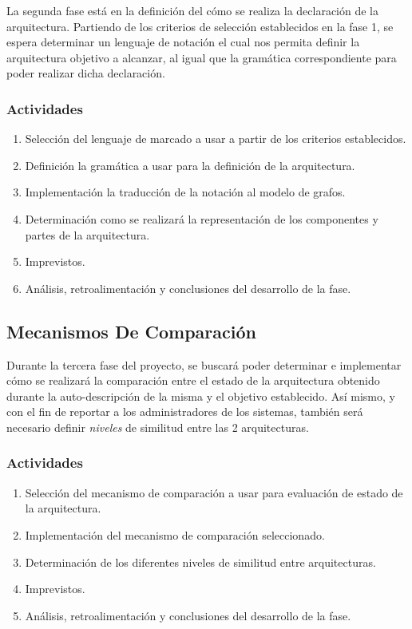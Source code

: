 \documentclass[12pt]{article}
\begin{document}
    La segunda fase está en la definición del cómo se realiza la declaración de la arquitectura. Partiendo de los criterios de selección establecidos en la fase 1, se espera determinar un lenguaje de notación el cual nos permita definir la arquitectura objetivo a alcanzar, al igual que la gramática correspondiente para poder realizar dicha declaración. 
    
    \subsubsection*{Actividades}

    \begin{enumerate}[label=\thesubsection.\arabic*., wide, labelindent=2em, leftmargin=5em]
        \item Selección del lenguaje de marcado a usar a partir de los criterios establecidos.
        \item Definición la gramática a usar para la definición de la arquitectura.
        \item Implementación la traducción de la notación al modelo de grafos. %
        \item Determinación como se realizará la representación de los componentes y partes de la arquitectura.
        \item Imprevistos.
        \item Análisis, retroalimentación y conclusiones del desarrollo de la fase. 
    \end{enumerate}    

    \subsection{Mecanismos De Comparación}

    Durante la tercera fase del proyecto, se buscará poder determinar e implementar cómo se realizará la comparación entre el estado de la arquitectura obtenido durante la auto-descripción de la misma y el objetivo establecido. Así mismo, y con el fin de reportar a los administradores de los sistemas, también será necesario definir \textit{niveles} de similitud entre las 2 arquitecturas.

    \subsubsection*{Actividades}

    \begin{enumerate}[label=\thesubsection.\arabic*., wide, labelindent=2em, leftmargin=5em]
        \item Selección del mecanismo de comparación a usar para evaluación de estado de la arquitectura.
        \item Implementación del mecanismo de comparación seleccionado.
        \item Determinación de los diferentes niveles de similitud entre arquitecturas.
        \item Imprevistos.
        \item Análisis, retroalimentación y conclusiones del desarrollo de la fase. 
    \end{enumerate}    
\end{document}
